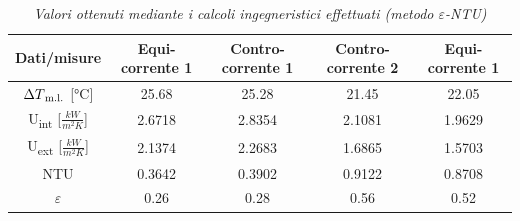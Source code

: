 \documentclass[a4paper,10pt]{article}                                                                                       %
\begin{document}
\begin{table}[H]                                                                                                            %
  \caption{\textit{Valori ottenuti mediante i calcoli ingegneristici effettuati (metodo $\varepsilon$-NTU)}}                %
  \label{tab:eps_ntu_calcs}                                                                                                 %
  \vspace{3mm}                                                                                                              %
  \centering                                                                                                                %
  \begin{tabular}{||c|c|c|c|c||}                                                                                            %
    \hline
    Dati/misure                                 & Equi-corrente 1 & Contro-corrente 1 & Contro-corrente 2 & Equi-corrente 1 \\
    \hline\hline
    $\Delta{T\textsubscript{m.l.}}$ [°C]        & 25.68           & 25.28             & 21.45             & 22.05           \\
    U\textsubscript{int} [$\frac{kW}{m^{2}K}$]  & 2.6718          & 2.8354            & 2.1081            & 1.9629          \\
    U\textsubscript{ext} [$\frac{kW}{m^{2}K}$]  & 2.1374          & 2.2683            & 1.6865            & 1.5703          \\
    NTU                                         & 0.3642          & 0.3902            & 0.9122            & 0.8708          \\
    $\varepsilon$                               & 0.26            & 0.28              & 0.56              & 0.52            \\
    \hline
  \end{tabular}                                                                                                             %
\end{table}                                                                                                                 %
\end{document}
